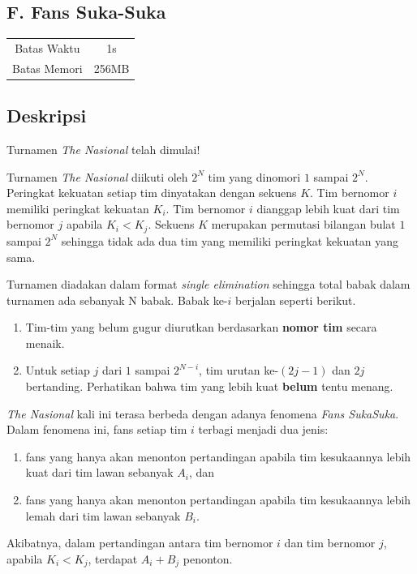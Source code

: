 \documentclass{article}
\begin{document}
\begin{center}
    \section*{F. Fans Suka-Suka} %

    \begin{tabular}{ | c c | }
        \hline
        Batas Waktu  & 1s \\    %
        Batas Memori & 256MB \\  %
        \hline
    \end{tabular}
\end{center}

\subsection*{Deskripsi}
Turnamen \textit{The Nasional} telah dimulai!

Turnamen \textit{The Nasional} diikuti oleh $2^N$ tim yang dinomori $1$ sampai $2^N$. Peringkat kekuatan setiap tim dinyatakan dengan sekuens $K$. Tim bernomor $i$ memiliki peringkat kekuatan $K_i$. Tim bernomor $i$ dianggap lebih kuat dari tim bernomor $j$ apabila $K_i < K_j$. Sekuens $K$ merupakan permutasi bilangan bulat $1$ sampai $2^N$ sehingga tidak ada dua tim yang memiliki peringkat kekuatan yang sama.

Turnamen diadakan dalam format \textit{single elimination} sehingga total babak dalam turnamen ada sebanyak N babak. Babak ke-$i$ berjalan seperti berikut.
\begin{enumerate}
    \item Tim-tim yang belum gugur diurutkan berdasarkan \textbf{nomor tim} secara menaik.
    \item Untuk setiap $j$ dari $1$ sampai $2^{N-i}$, tim urutan ke-$(2j-1)$ dan $2j$ bertanding. Perhatikan bahwa tim yang lebih kuat \textbf{belum} tentu menang.
\end{enumerate}

\textit{The Nasional} kali ini terasa berbeda dengan adanya fenomena \textit{Fans SukaSuka}. Dalam fenomena ini, fans setiap tim $i$ terbagi menjadi dua jenis:
\begin{enumerate}
    \item fans yang hanya akan menonton pertandingan apabila tim kesukaannya lebih kuat dari tim lawan sebanyak $A_i$, dan
    \item fans yang hanya akan menonton pertandingan apabila tim kesukaannya lebih lemah dari tim lawan sebanyak $B_i$. 
\end{enumerate}
Akibatnya, dalam pertandingan antara tim bernomor $i$ dan tim bernomor $j$, apabila $K_i < K_j$, terdapat $A_i + B_j$ penonton.
\end{document}
